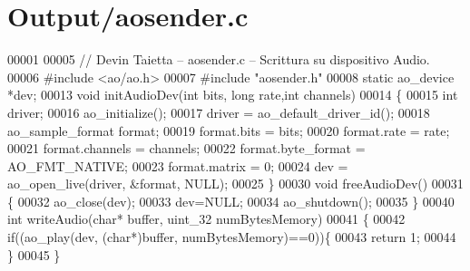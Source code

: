 \hypertarget{aosender_8c_source}{\section{\-Output/aosender.c}
}

\begin{DoxyCode}
00001 
00005 \textcolor{comment}{// Devin Taietta -- aosender.c -- Scrittura su dispositivo Audio.}
00006 \textcolor{preprocessor}{#include <ao/ao.h>}
00007 \textcolor{preprocessor}{#include "aosender.h"}
00008 \textcolor{keyword}{static} ao\_device    *dev;
00013 \textcolor{keywordtype}{void} initAudioDev(\textcolor{keywordtype}{int} bits, \textcolor{keywordtype}{long} rate,\textcolor{keywordtype}{int} channels)
00014 \{
00015     \textcolor{keywordtype}{int} driver;
00016     ao\_initialize();
00017     driver = ao\_default\_driver\_id();
00018     ao\_sample\_format format;
00019     format.bits = bits;
00020     format.rate = rate;
00021     format.channels = channels;
00022     format.byte\_format = AO\_FMT\_NATIVE;
00023     format.matrix = 0;
00024     dev = ao\_open\_live(driver, &format, NULL);
00025 \}
00030 \textcolor{keywordtype}{void} freeAudioDev()
00031 \{
00032     ao\_close(dev);
00033     dev=NULL;
00034     ao\_shutdown();
00035 \}
00040 \textcolor{keywordtype}{int} writeAudio(\textcolor{keywordtype}{char}* buffer, uint\_32 numBytesMemory)
00041 \{
00042         \textcolor{keywordflow}{if}((ao\_play(dev, (\textcolor{keywordtype}{char}*)buffer, numBytesMemory)==0))\{
00043             \textcolor{keywordflow}{return} 1;
00044         \}
00045 \}
\end{DoxyCode}
